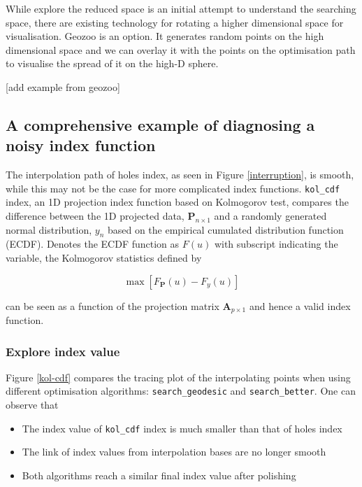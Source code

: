 \documentclass[12pt]{article}
\providecommand{\tightlist}{%
  \setlength{\itemsep}{0pt}\setlength{\parskip}{0pt}}
\begin{document}
While explore the reduced space is an initial attempt to understand the
searching space, there are existing technology for rotating a higher
dimensional space for visualisation. Geozoo is an option. It generates
random points on the high dimensional space and we can overlay it with
the points on the optimisation path to visualise the spread of it on the
high-D sphere.

{[}add example from geozoo{]}

\hypertarget{a-comprehensive-example-of-diagnosing-a-noisy-index-function}{%
\subsection{A comprehensive example of diagnosing a noisy index
function}\label{a-comprehensive-example-of-diagnosing-a-noisy-index-function}}

The interpolation path of holes index, as seen in Figure
\ref{interruption}, is smooth, while this may not be the case for more
complicated index functions. \texttt{kol\_cdf} index, an 1D projection
index function based on Kolmogorov test, compares the difference between
the 1D projected data, \(\mathbf{P}_{n \times 1}\) and a randomly
generated normal distribution, \(y_n\) based on the empirical cumulated
distribution function (ECDF). Denotes the ECDF function as \(F(u)\) with
subscript indicating the variable, the Kolmogorov statistics defined by

\[\max \left[F_{\mathbf{P}}(u) - F_{y}(u)\right]\]

can be seen as a function of the projection matrix
\(\mathbf{A}_{p \times 1}\) and hence a valid index function.

\hypertarget{explore-index-value}{%
\subsubsection{Explore index value}\label{explore-index-value}}

Figure \ref{kol-cdf} compares the tracing plot of the interpolating
points when using different optimisation algorithms:
\texttt{search\_geodesic} and \texttt{search\_better}. One can observe
that

\begin{itemize}
\tightlist
\item
  The index value of \texttt{kol\_cdf} index is much smaller than that
  of holes index
\item
  The link of index values from interpolation bases are no longer smooth
\item
  Both algorithms reach a similar final index value after polishing
\end{itemize}
\end{document}
